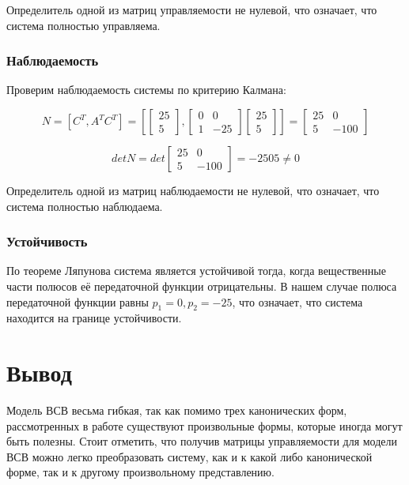\documentclass[14pt,a4paper,report]{report}
\begin{document}
Определитель одной из матриц управляемости не нулевой, что означает, что система полностью управляема.

\subsubsection{Наблюдаемость}

Проверим наблюдаемость системы по критерию Калмана:

\begin{equation*}
\text{$N=[C^T,A^TC^T]=[\begin{bmatrix} 25 \\ 5 \end{bmatrix},\begin{bmatrix} 0 & 0 \\ 1 & -25 \end{bmatrix}\begin{bmatrix} 25 \\ 5 \end{bmatrix}]=\begin{bmatrix} 25 & 0 \\ 5 & -100 \end{bmatrix}$}
\end{equation*}

\begin{equation*}
\text{$detN=det\begin{bmatrix} 25 & 0 \\ 5 & -100 \end{bmatrix}=-2505\neq 0$}
\end{equation*}

Определитель одной из матриц наблюдаемости не нулевой, что означает, что система полностью наблюдаема.

\subsubsection{Устойчивость}

По теореме Ляпунова система является устойчивой тогда, когда вещественные части полюсов её передаточной функции отрицательны. В нашем случае полюса передаточной функции равны $p_1=0, p_2=-25$, что означает, что система находится на границе устойчивости. 

\section{Вывод}

Модель ВСВ весьма гибкая, так как помимо трех канонических форм, рассмотренных в работе существуют произвольные формы, которые иногда могут быть полезны. Стоит отметить, что получив матрицы управляемости для модели ВСВ можно легко преобразовать систему, как и к какой либо канонической форме, так и к другому произвольному представлению.
\end{document}
